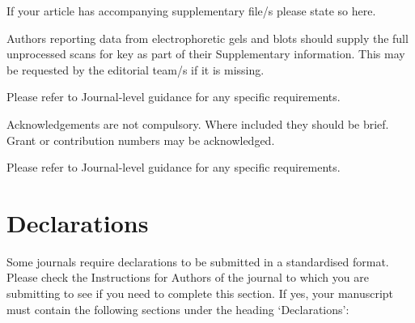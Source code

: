 \documentclass[pdflatex,sn-mathphys-num]{sn-jnl}%
\theoremstyle{thmstyleone}%
\theoremstyle{thmstyletwo}%
\theoremstyle{thmstylethree}%
\begin{document}



\backmatter


If your article has accompanying supplementary file/s please state so here. 

Authors reporting data from electrophoretic gels and blots should supply the full unprocessed scans for key as part of their Supplementary information. This may be requested by the editorial team/s if it is missing.

Please refer to Journal-level guidance for any specific requirements.


Acknowledgements are not compulsory. Where included they should be brief. Grant or contribution numbers may be acknowledged.

Please refer to Journal-level guidance for any specific requirements.

\section*{Declarations}

Some journals require declarations to be submitted in a standardised format. Please check the Instructions for Authors of the journal to which you are submitting to see if you need to complete this section. If yes, your manuscript must contain the following sections under the heading `Declarations':
\end{document}
